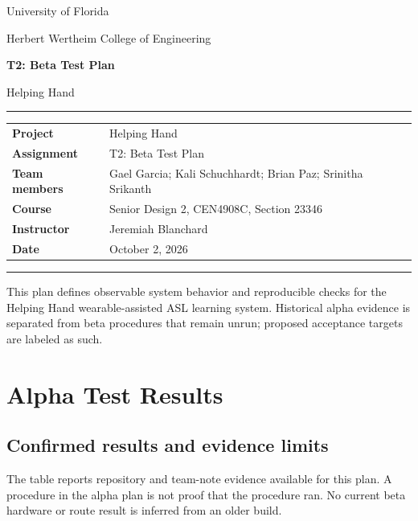 \documentclass[10pt,letterpaper]{article}
\begin{document}
\hypersetup{pageanchor=false}
\begin{titlepage}
\thispagestyle{empty}
\vspace*{0.55in}
{\large University of Florida\par}
{\normalsize Herbert Wertheim College of Engineering\par}
\vspace{0.88in}
{\Huge\bfseries T2: Beta Test Plan\par}
\vspace{0.16in}
{\LARGE Helping Hand\par}
\vspace{0.34in}
\rule{\textwidth}{0.6pt}
\vspace{0.20in}
\begin{tabularx}{\textwidth}{@{}P{1.5in}Y@{}}
\textbf{Project} & Helping Hand \\
\textbf{Assignment} & T2: Beta Test Plan \\
\textbf{Team members} & Gael Garcia; Kali Schuchhardt; Brian Paz; Srinitha Srikanth \\
\textbf{Course} & Senior Design 2, CEN4908C, Section 23346 \\
\textbf{Instructor} & Jeremiah Blanchard \\
\textbf{Date} & October 2, 2026 \\
\end{tabularx}
\vspace{0.20in}
\rule{\textwidth}{0.6pt}
\vfill
\begin{minipage}{\textwidth}
\small This plan defines observable system behavior and reproducible checks for the Helping Hand wearable-assisted ASL learning system. Historical alpha evidence is separated from beta procedures that remain unrun; proposed acceptance targets are labeled as such.
\end{minipage}
\end{titlepage}
\hypersetup{pageanchor=true}

\section{Alpha Test Results}
\subsection{Confirmed results and evidence limits}
The table reports repository and team-note evidence available for this plan. A procedure in the alpha plan is not proof that the procedure ran. No current beta hardware or route result is inferred from an older build.
\end{document}
